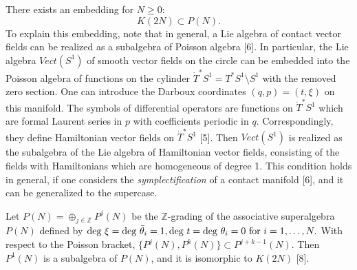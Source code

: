 \documentclass[a4paper,a4paper]{article}
\begin{document}
There exists an embedding for $N \geq 0$:
\begin{equation}
K(2N) \subset P(N).
\end{equation}
To explain this embedding, note that
in general, a  Lie algebra of contact vector fields
can be realized as a
subalgebra of Poisson algebra [6]. 
In particular, the Lie algebra $Vect(S^1)$
of smooth vector fields on the circle can be embedded
into the Poisson algebra of functions on 
the cylinder $\dot{T}^*S^1 = T^*S^1\setminus S^1$
with the removed zero section.
One can  introduce 
the Darboux coordinates
$(q, p) = (t, \xi)$ on this manifold.
The symbols of differential operators are functions on  $\dot{T}^*S^1$
which are formal Laurent series in $p$ with coefficients
periodic in $q$. Correspondingly, 
they define Hamiltonian vector fields on $\dot{T}^*S^1$ [5].
Then  $Vect(S^1)$ is realized as 
the subalgebra of the Lie algebra of
Hamiltonian vector fields, consisting of the fields  with Hamiltonians 
which are homogeneous of degree 1.
This condition holds in general, if one considers the
{\it symplectification} of a contact manifold [6], and
it can be generalized to the supercase.

Let  $P(N) = \oplus_{j\in\mathbb Z}P^j(N)$ be the 
$\mathbb Z$-grading of the associative superalgebra $P(N)$
defined by
$\hbox{deg }\xi = 
\hbox{deg } \bar{\theta}_i = 1,  
\hbox{deg } t =
\hbox{deg } {\theta}_i = 0 \hbox{ for }i = 1, \ldots, N.$
With respect to the Poisson bracket,
$\lbrace P^j(N), P^k(N)\rbrace \subset P^{j+k-1}(N).$
Then $P^1(N)$ is a subalgebra of $P(N)$, and it is isomorphic to $K(2N)$ [8].
\end{document}
